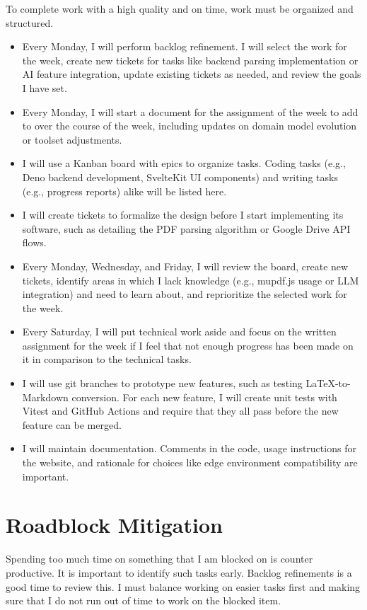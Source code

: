 \documentclass[12pt]{article}
\begin{document}
To complete work with a high quality and on time, work must be organized and structured.
\begin{itemize}
  \item Every Monday, I will perform backlog refinement. I will select the work for the week, create new tickets for tasks like backend parsing implementation or AI feature integration, update existing tickets as needed, and review the goals I have set.
  \item Every Monday, I will start a document for the assignment of the week to add to over the course of the week, including updates on domain model evolution or toolset adjustments.
  \item I will use a Kanban board with epics to organize tasks. Coding tasks (e.g., Deno backend development, SvelteKit UI components) and writing tasks (e.g., progress reports) alike will be listed here.
  \item I will create tickets to formalize the design before I start implementing its software, such as detailing the PDF parsing algorithm or Google Drive API flows.
  \item Every Monday, Wednesday, and Friday, I will review the board, create new tickets, identify areas in which I lack knowledge (e.g., mupdf.js usage or LLM integration) and need to learn about, and reprioritize the selected work for the week.
  \item Every Saturday, I will put technical work aside and focus on the written assignment for the week if I feel that not enough progress has been made on it in comparison to the technical tasks.
  \item I will use git branches to prototype new features, such as testing LaTeX-to-Markdown conversion. For each new feature, I will create unit tests with Vitest and GitHub Actions and require that they all pass before the new feature can be merged.
  \item I will maintain documentation. Comments in the code, usage instructions for the website, and rationale for choices like edge environment compatibility are important.
\end{itemize}

\section{Roadblock Mitigation}
Spending too much time on something that I am blocked on is counter productive. It is important to identify such tasks early. Backlog refinements is a good time to review this. I must balance working on easier tasks first and making sure that I do not run out of time to work on the blocked item.
\end{document}
